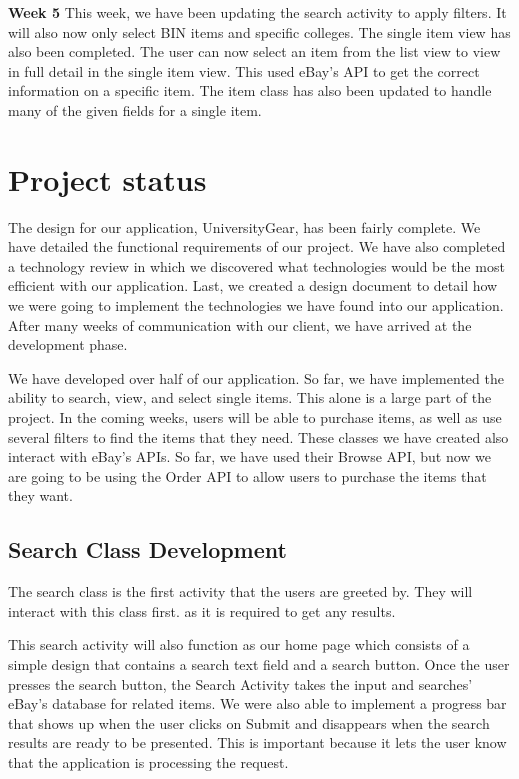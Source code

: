 \documentclass[journal,compsoc, 10pt, draftclsnofoot, onecolumn]{IEEEtran}
\begin{document}
\textbf{Week 5}\newline
This week, we have been updating the search activity to apply filters. It will 
also now only select BIN items and specific colleges. The single item view has 
also been completed. The user can now select an item from the list view to view 
in full detail in the single item view. This used eBay's API to get the correct 
information on a specific item. The item class has also been updated to handle 
many of the given fields for a single item. 


\section{Project status}
The design for our application, UniversityGear, has been fairly complete. We 
have detailed the functional requirements of our project. We have also completed 
a technology review in which we discovered what technologies would be the most 
efficient with our application. Last, we created a design document to detail how 
we were going to implement the technologies we have found into our application.
After many weeks of communication with our client, we have arrived at the 
development phase.\newline

We have developed over half of our application. So far, we have implemented the 
ability to search, view, and select single items. This alone is a large part of 
the project. In the coming weeks, users will be able to purchase items, as well 
as use several filters to find the items that they need. These classes we have 
created also interact with eBay's APIs. So far, we have used their Browse API, 
but now we are going to be using the Order API to allow users to purchase the 
items that they want. 

\subsection{Search Class Development}
The search class is the first activity that the users are greeted by. They will 
interact with this class first. as it is required to get any results. 

This search activity will also function as our home page which consists of a
simple design that contains a search text field and a search button. Once the 
user presses the search button, the Search Activity takes the input and 
searches' eBay's database for related items. We were also able to implement a 
progress bar that shows up when the user clicks on Submit and disappears when 
the search results are ready to be presented. This is important because it lets 
the user know that the application is processing the request. 
\end{document}
